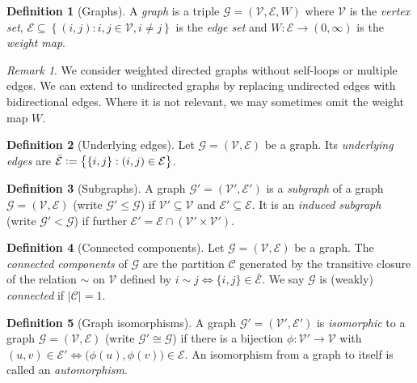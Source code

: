 \documentclass[12pt]{ociamthesis}
\theoremstyle{plain}
\theoremstyle{definition}
\newtheorem{definition}{Definition}[chapter]
\theoremstyle{remark}
\newtheorem*{remark}{Remark}
\newcommand\ca[1]{\mathcal{#1}}
\begin{document}
\begin{definition}[Graphs]
  A \emph{graph} is a triple $\ca{G} = (\ca{V,E},W)$ where $\ca{V}$ is the
  \emph{vertex set}, $\ca{E} \subseteq \left\{ (i,j) : i,j \in \ca{V}, i \neq j
  \right\}$ is the \emph{edge set} and $W\colon \ca{E} \to (0,\infty)$ is the
  \emph{weight map}.
\end{definition}

\begin{remark}
  We consider weighted directed graphs without self-loops or multiple edges. We
  can extend to undirected graphs by replacing undirected edges with
  bidirectional edges. Where it is not relevant, we may sometimes omit the
  weight map $W$.
\end{remark}

\begin{definition}[Underlying edges]
  Let $\ca{G} = (\ca{V,E})$ be a graph. Its \emph{underlying edges} are
  $\bar{\ca{E}} \vcentcolon = \big\{ \{i,j\} : (i,j) \in \ca{E} \big\}$.
\end{definition}

\begin{definition}[Subgraphs]
  A graph $\ca{G'} = (\ca{V',E'})$ is a \emph{subgraph} of a graph $\ca{G} =
  (\ca{V,E})$ (write $\ca{G'} \leq \ca{G}$) if $\ca{V'} \subseteq \ca{V}$ and
  $\ca{E'} \subseteq \ca{E}$. It is an \emph{induced subgraph} (write $\ca{G'}
  < \ca{G}$) if further $\ca{E'} = \ca{E} \cap ( \ca{V'} \times \ca{V'} )$.
\end{definition}

\begin{definition}[Connected components]
  Let $\ca{G} = (\ca{V,E})$ be a graph. The \emph{connected components} of
  $\ca{G}$ are the partition $\ca{C}$ generated by the transitive closure of
  the relation $\sim$ on $\ca{V}$ defined by $i \sim j \iff \{i,j\} \in
  \bar{\ca{E}}$. We say $\ca{G}$ is (weakly) \emph{connected} if $|\ca{C}| =
  1$.
\end{definition}

\begin{definition}[Graph isomorphisms]
  A graph $\ca{G'} = (\ca{V',E'})$ is \emph{isomorphic} to a graph $\ca{G} =
  (\ca{V,E})$ (write $\ca{G'} \cong \ca{G}$) if there is a bijection
  $\phi\colon \ca{V'} \rightarrow \ca{V}$ with $(u,v) \in \ca{E'} \iff
  \big(\phi(u), \phi(v) \big) \in \ca{E}$.
  An isomorphism from a graph to itself is called an \emph{automorphism}.
\end{definition}
\end{document}
